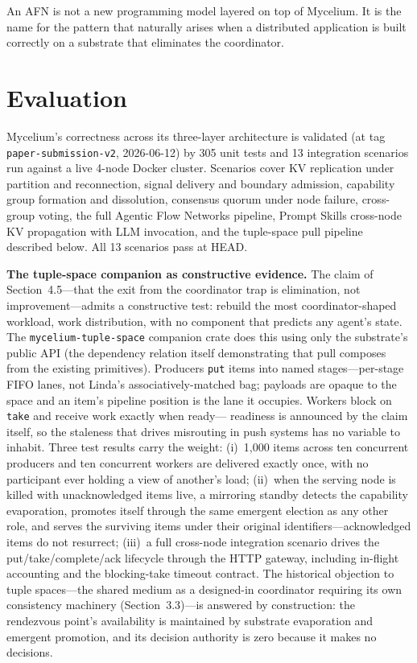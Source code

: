 \documentclass[11pt]{article}
\begin{document}
An AFN is not a new programming model layered on top of Mycelium. It is the name
for the pattern that naturally arises when a distributed application is built
correctly on a substrate that eliminates the coordinator.

\section{Evaluation}

Mycelium's correctness across its three-layer architecture is validated (at tag
\texttt{paper-submission-v2}, 2026-06-12) by 305 unit tests and 13 integration
scenarios run against a live 4-node Docker cluster.
Scenarios cover KV replication under partition and reconnection, signal delivery
and boundary admission, capability group formation and dissolution, consensus
quorum under node failure, cross-group voting, the full Agentic Flow Networks
pipeline, Prompt Skills cross-node KV propagation with LLM invocation, and the
tuple-space pull pipeline described below. All 13 scenarios pass at HEAD.

\textbf{The tuple-space companion as constructive evidence.} The claim of
Section~4.5---that the exit from the coordinator trap is elimination, not
improvement---admits a constructive test: rebuild the most coordinator-shaped
workload, work distribution, with no component that predicts any agent's state.
The \texttt{mycelium-tuple-space} companion crate does this using only the
substrate's public API (the dependency relation itself demonstrating that pull
composes from the existing primitives). Producers \texttt{put} items into named
stages---per-stage FIFO lanes, not Linda's associatively-matched bag; payloads
are opaque to the space and an item's pipeline position is the lane it
occupies. Workers block on \texttt{take} and receive work exactly when ready---
readiness is announced by the claim itself, so the staleness that drives
misrouting in push systems has no variable to inhabit. Three test results carry
the weight: (i)~1{,}000 items across ten concurrent producers and ten concurrent
workers are delivered exactly once, with no participant ever holding a view of
another's load; (ii)~when the serving node is killed with unacknowledged items
live, a mirroring standby detects the capability evaporation, promotes itself
through the same emergent election as any other role, and serves the surviving
items under their original identifiers---acknowledged items do not resurrect;
(iii)~a full cross-node integration scenario drives the
put/take/complete/ack lifecycle through the HTTP gateway, including in-flight
accounting and the blocking-take timeout contract. The historical objection to
tuple spaces---the shared medium as a designed-in coordinator requiring its own
consistency machinery (Section~3.3)---is answered by construction: the rendezvous
point's availability is maintained by substrate evaporation and emergent
promotion, and its decision authority is zero because it makes no decisions.
\end{document}
